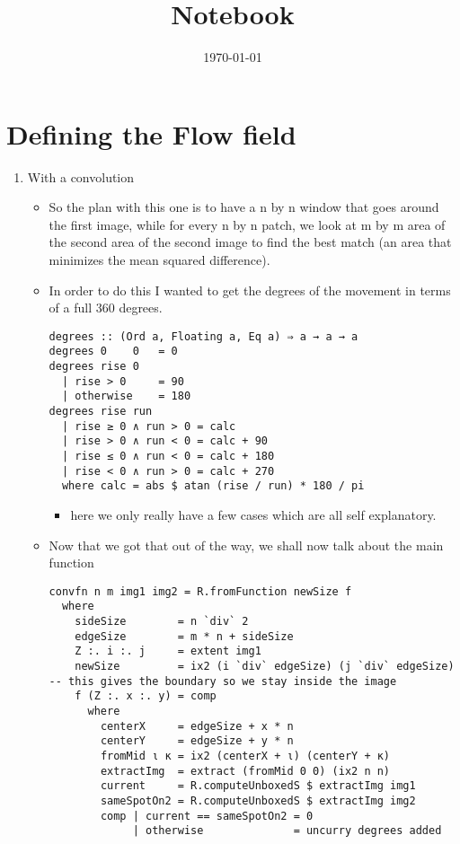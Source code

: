 \documentclass{article}
\date{\today}
\title{Notebook}
\begin{document}
\maketitle
\tableofcontents

\section{Defining the Flow field}
\label{sec-1}
\begin{enumerate}
\item With a convolution
\label{sec-1-1}
\begin{itemize}
\item So the plan with this one is to have a n by n window that goes
around the first image, while for every n by n patch, we look at m
by m area of the second area of the second image to find the best
match (an area that minimizes the mean squared difference).
\item In order to do this I wanted to get the degrees of the movement in
terms of a full 360 degrees.
\begin{verbatim}
degrees :: (Ord a, Floating a, Eq a) ⇒ a → a → a
degrees 0    0   = 0
degrees rise 0
  | rise > 0     = 90
  | otherwise    = 180
degrees rise run
  | rise ≥ 0 ∧ run > 0 = calc
  | rise > 0 ∧ run < 0 = calc + 90
  | rise ≤ 0 ∧ run < 0 = calc + 180
  | rise < 0 ∧ run > 0 = calc + 270
  where calc = abs $ atan (rise / run) * 180 / pi
\end{verbatim}
\begin{itemize}
\item here we only really have a few cases which are all self
explanatory.
\end{itemize}
\item Now that we got that out of the way, we shall now talk about the
main function
\begin{verbatim}
convfn n m img1 img2 = R.fromFunction newSize f
  where
    sideSize        = n `div` 2
    edgeSize        = m * n + sideSize
    Z :. i :. j     = extent img1
    newSize         = ix2 (i `div` edgeSize) (j `div` edgeSize) -- this gives the boundary so we stay inside the image
    f (Z :. x :. y) = comp
      where
        centerX     = edgeSize + x * n
        centerY     = edgeSize + y * n
        fromMid ι κ = ix2 (centerX + ι) (centerY + κ)
        extractImg  = extract (fromMid 0 0) (ix2 n n)
        current     = R.computeUnboxedS $ extractImg img1
        sameSpotOn2 = R.computeUnboxedS $ extractImg img2
        comp | current == sameSpotOn2 = 0
             | otherwise              = uncurry degrees added

\end{verbatim}
\end{itemize}
\end{enumerate}
\end{document}
